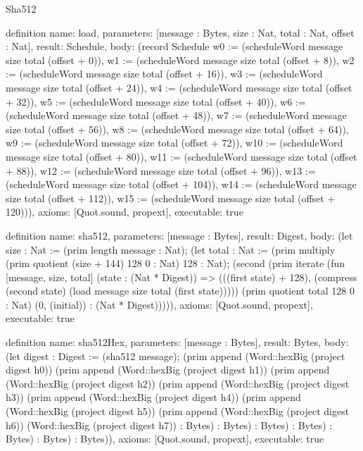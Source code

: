 \begin{lexlean}{Sha512}
\begin{semanticmodule}
definition{
  name: load,
  parameters: [message : Bytes, size : Nat, total : Nat, offset : Nat],
  result: Schedule,
  body: (record Schedule {w0 := (scheduleWord message size total (offset + 0)), w1 := (scheduleWord message size total (offset + 8)), w2 := (scheduleWord message size total (offset + 16)), w3 := (scheduleWord message size total (offset + 24)), w4 := (scheduleWord message size total (offset + 32)), w5 := (scheduleWord message size total (offset + 40)), w6 := (scheduleWord message size total (offset + 48)), w7 := (scheduleWord message size total (offset + 56)), w8 := (scheduleWord message size total (offset + 64)), w9 := (scheduleWord message size total (offset + 72)), w10 := (scheduleWord message size total (offset + 80)), w11 := (scheduleWord message size total (offset + 88)), w12 := (scheduleWord message size total (offset + 96)), w13 := (scheduleWord message size total (offset + 104)), w14 := (scheduleWord message size total (offset + 112)), w15 := (scheduleWord message size total (offset + 120))}),
  axioms: [Quot.sound, propext],
  executable: true
}

definition{
  name: sha512,
  parameters: [message : Bytes],
  result: Digest,
  body: (let size : Nat := (prim length message : Nat); (let total : Nat := (prim multiply (prim quotient (size + 144) 128 0 : Nat) 128 : Nat); (second (prim iterate (fun [message, size, total] (state : (Nat * Digest)) => (((first state) + 128), (compress (second state) (load message size total (first state))))) (prim quotient total 128 0 : Nat) (0, (initial)) : (Nat * Digest))))),
  axioms: [Quot.sound, propext],
  executable: true
}

definition{
  name: sha512Hex,
  parameters: [message : Bytes],
  result: Bytes,
  body: (let digest : Digest := (sha512 message); (prim append (Word::hexBig (project digest h0)) (prim append (Word::hexBig (project digest h1)) (prim append (Word::hexBig (project digest h2)) (prim append (Word::hexBig (project digest h3)) (prim append (Word::hexBig (project digest h4)) (prim append (Word::hexBig (project digest h5)) (prim append (Word::hexBig (project digest h6)) (Word::hexBig (project digest h7)) : Bytes) : Bytes) : Bytes) : Bytes) : Bytes) : Bytes) : Bytes)),
  axioms: [Quot.sound, propext],
  executable: true
}
\end{semanticmodule}
\end{lexlean}
